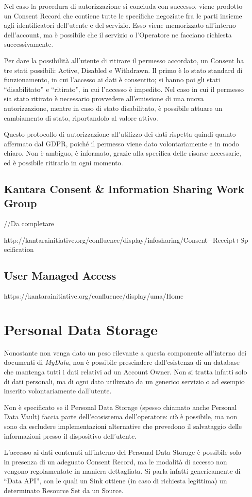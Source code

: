 Nel caso la procedura di autorizzazione si concluda con successo, viene prodotto un Consent Record che contiene tutte le specifiche negoziate fra le parti insieme agli identificatori dell’utente e del servizio. Esso viene memorizzato all’interno dell’account, ma \`e possibile che il servizio o l’Operatore ne facciano richiesta successivamente. 

Per dare la possibilit\`a all’utente di ritirare il permesso accordato, un Consent ha tre stati possibili: Active, Disabled e Withdrawn. Il primo \`e lo stato standard di funzionamento, in cui l’accesso ai dati \`e consentito; si hanno poi gli stati “disabilitato” e “ritirato”, in cui l’accesso \`e impedito. Nel caso in cui il permesso sia stato ritirato \`e necessario provvedere all’emissione di una nuova autorizzazione, mentre in caso di stato disabilitato, \`e possibile attuare un cambiamento di stato, riportandolo al valore attivo.

Questo protocollo di autorizzazione all’utilizzo dei dati rispetta quindi quanto affermato dal GDPR, poich\'e il permesso viene dato volontariamente e in modo chiaro. Non \`e ambiguo, \`e informato, grazie alla specifica delle risorse necessarie, ed \`e possibile ritirarlo in ogni momento.

\subsection{Kantara Consent \& Information Sharing Work Group}
//Da completare

http://kantarainitiative.org/confluence/display/infosharing/Consent+Receipt+Specification

\subsection{User Managed Access}
https://kantarainitiative.org/confluence/display/uma/Home

\section{Personal Data Storage}
Nonostante non venga dato un peso rilevante a questa componente all’interno dei documenti di \textit{MyData}, non \`e possibile prescindere dall’esistenza di un database che mantenga tutti i dati relativi ad un Account Owner. Non si tratta infatti solo di dati personali, ma di ogni dato utilizzato da un generico servizio o ad esempio inserito volontariamente dall’utente.

Non \`e specificato se il Personal Data Storage (spesso chiamato anche Personal Data Vault) faccia parte dell’ecosistema dell’operatore: ci\`o \`e possibile, ma non sono da escludere implementazioni alternative che prevedono il salvataggio delle informazioni presso il dispositivo dell’utente.

L’accesso ai dati contenuti all’interno del Personal Data Storage \`e possibile solo in presenza di un adeguato Consent Record, ma le modalit\`a di accesso non vengono regolamentate in maniera dettagliata. Si parla infatti genericamente di “Data API”, con le quali un Sink ottiene (in caso di richiesta legittima) un determinato Resource Set da un Source.


